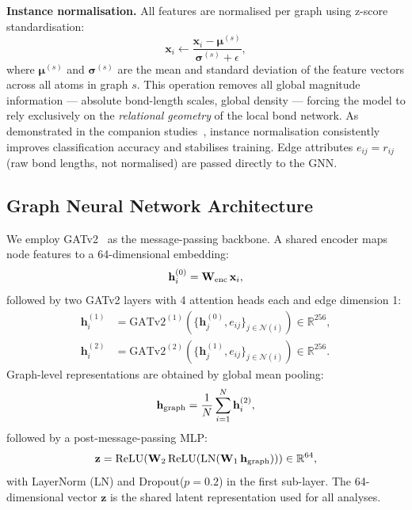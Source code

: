 \documentclass[12pt,a4paper]{article}
\begin{document}
\textbf{Instance normalisation.}
All features are normalised per graph using z-score standardisation:
\begin{equation}
\mathbf{x}_i \leftarrow \frac{\mathbf{x}_i - \boldsymbol{\mu}^{(s)}}{\boldsymbol{\sigma}^{(s)} + \epsilon},
\label{eq:instnorm}
\end{equation}
where $\boldsymbol{\mu}^{(s)}$ and $\boldsymbol{\sigma}^{(s)}$ are the mean and standard deviation of the feature vectors across all atoms in graph $s$.
This operation removes all global magnitude information — absolute bond-length scales, global density — forcing the model to rely exclusively on the \emph{relational geometry} of the local bond network.
As demonstrated in the companion studies~\cite{Singh2025Paper1,Singh2025Paper2}, instance normalisation consistently improves classification accuracy and stabilises training.
Edge attributes $e_{ij} = r_{ij}$ (raw bond lengths, not normalised) are passed directly to the GNN.

\subsection{Graph Neural Network Architecture}
\label{sec:gnn}

We employ GATv2~\cite{Brody2021} as the message-passing backbone.
A shared encoder maps node features to a 64-dimensional embedding:
\begin{equation}
\mathbf{h}_i^{(0)} = \mathbf{W}_{\rm enc}\,\mathbf{x}_i,
\end{equation}
followed by two GATv2 layers with 4 attention heads each and edge dimension 1:
\begin{align}
\mathbf{h}_i^{(1)} &= \mathrm{GATv2}^{(1)}\!\left(\{\mathbf{h}_j^{(0)}, e_{ij}\}_{j \in \mathcal{N}(i)}\right) \in \mathbb{R}^{256}, \\
\mathbf{h}_i^{(2)} &= \mathrm{GATv2}^{(2)}\!\left(\{\mathbf{h}_j^{(1)}, e_{ij}\}_{j \in \mathcal{N}(i)}\right) \in \mathbb{R}^{256}.
\end{align}
Graph-level representations are obtained by global mean pooling:
\begin{equation}
\mathbf{h}_{\rm graph} = \frac{1}{N} \sum_{i=1}^N \mathbf{h}_i^{(2)},
\end{equation}
followed by a post-message-passing MLP:
\begin{equation}
\mathbf{z} = \mathrm{ReLU}\!\left(\mathbf{W}_2 \,\mathrm{ReLU}\!\left(\mathrm{LN}\!\left(\mathbf{W}_1\,\mathbf{h}_{\rm graph}\right)\right)\right) \in \mathbb{R}^{64},
\label{eq:latent}
\end{equation}
with LayerNorm (LN) and Dropout($p=0.2$) in the first sub-layer.
The 64-dimensional vector $\mathbf{z}$ is the shared latent representation used for all analyses.
\end{document}
